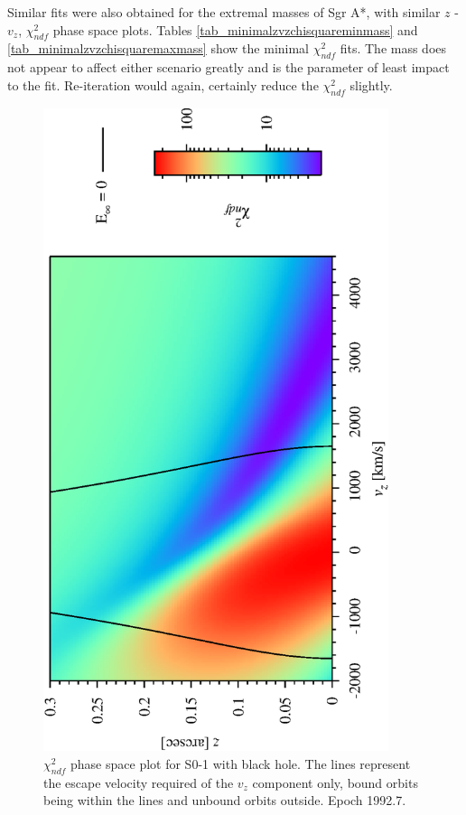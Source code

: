 Similar fits were also obtained for the extremal masses of Sgr A*, with similar $z$ - $v_z$, $\chi^2_{ndf}$ phase space plots.
Tables \ref{tab_minimalzvzchisquareminmass} and \ref{tab_minimalzvzchisquaremaxmass} show the minimal $\chi^2_{ndf}$ fits.
The mass does not appear to affect either scenario greatly and is the parameter of least impact to the fit. Re-iteration
would again, certainly reduce the $\chi^2_{ndf}$ slightly.
\clearpage
\begin{figure}[!pt]
	\begin{center}
	\includegraphics[angle=-90,width=0.9\textwidth]{eps/so1-BH-run3.eps}
	\caption{$\chi^2_{ndf}$ phase space plot for S0-1 with black hole. The lines represent the escape velocity required of the $v_z$
	component only, bound orbits being within the lines and unbound orbits outside. Epoch 1992.7.}
	\label{fig_so1BHphasespace}
	\end{center}
\end{figure}
